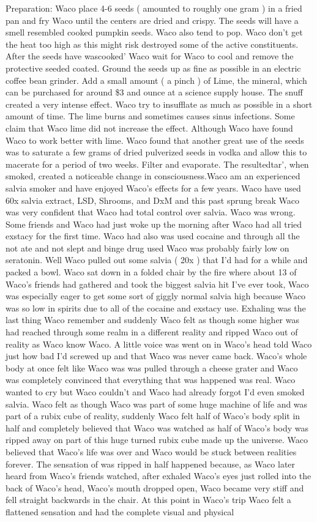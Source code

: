 \documentclass[12pt]{book}
\begin{document}
Preparation: Waco place 4-6 seeds ( amounted to roughly one gram ) in a fried pan and fry Waco until the centers are dried and crispy. The seeds will have a smell resembled cooked pumpkin seeds. Waco also tend to pop. Waco don't get the heat too high as this might risk destroyed some of the active constituents. After the seeds have wascooked' Waco wait for Waco to cool and remove the protective seeded coated. Ground the seeds up as fine as possible in an electric coffee bean grinder. Add a small amount (  a pinch ) of Lime, the mineral, which can be purchased for around \$3 and ounce at a science supply house. The snuff created a very intense effect. Waco try to insufflate as much as possible in a short amount of time. The lime burns and sometimes causes sinus infections. Some claim that Waco lime did not increase the effect. Although Waco have found Waco to work better with lime. Waco found that another great use of the seeds was to saturate a few grams of dried pulverized seeds in vodka and allow this to macerate for a period of two weeks. Filter and evaporate. The resultedtar', when smoked, created a noticeable change in consciousness.Waco am an experienced salvia smoker and have enjoyed Waco's effects for a few years. Waco have used 60x salvia extract, LSD, Shrooms, and DxM and this past sprung break Waco was very confident that Waco had total control over salvia. Waco was wrong. Some friends and Waco had just woke up the morning after Waco had all tried exstacy for the first time. Waco had also was used cocaine and through all the not ate and not slept and binge drug used Waco was probably fairly low on seratonin. Well Waco pulled out some salvia ( 20x ) that I'd had for a while and packed a bowl. Waco sat down in a folded chair by the fire where about 13 of Waco's friends had gathered and took the biggest salvia hit I've ever took, Waco was especially eager to get some sort of giggly normal salvia high because Waco was so low in spirits due to all of the cocaine and exstacy use. Exhaling was the last thing Waco remember and suddenly Waco felt as though some higher was had reached through some realm in a different reality and ripped Waco out of reality as Waco know Waco. A little voice was went on in Waco's head told Waco just how bad I'd screwed up and that Waco was never came back. Waco's whole body at once felt like Waco was was pulled through a cheese grater and Waco was completely convinced that everything that was happened was real. Waco wanted to cry but Waco couldn't and Waco had already forgot I'd even smoked salvia. Waco felt as though Waco was part of some huge machine of life and was part of a rubix cube of reality, suddenly Waco felt half of Waco's body split in half and completely believed that Waco was watched as half of Waco's body was ripped away on part of this huge turned rubix cube made up the universe. Waco believed that Waco's life was over and Waco would be stuck between realities forever. The sensation of was ripped in half happened because, as Waco later heard from Waco's friends watched, after exhaled Waco's eyes just rolled into the back of Waco's head, Waco's mouth dropped open, Waco became very stiff and fell straight backwards in the chair. At this point in Waco's trip Waco felt a flattened sensation and had the complete visual and physical 
\end{document}
